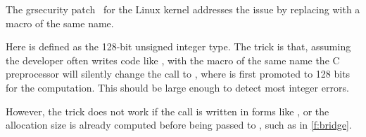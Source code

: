 \fi

The grsecurity patch~\cite{grsecurity}
for the Linux kernel addresses the issue by replacing
 with a macro of the same name.
%

%
Here  is defined as the 128-bit unsigned integer
type.  The trick is that, assuming the developer often writes code
like , with the macro of the same name
the C preprocessor will silently change the call to
, where  is first
promoted to 128 bits for the computation.  This should be large
enough to detect most integer errors.

However, the trick does not work if the call is written in forms
like , or the allocation
size is already computed before being passed to , such
as in \autoref{f:bridge}.
\fi
